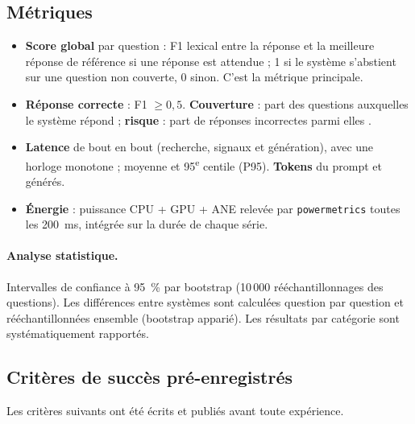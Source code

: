 \documentclass[11pt,a4paper]{article}
\begin{document}
\subsection{Métriques}

\begin{itemize}
\item \textbf{Score global} par question : F1 lexical entre la réponse et la meilleure réponse de
référence si une réponse est attendue ; 1 si le système s'abstient sur une question non couverte, 0
sinon. C'est la métrique principale.
\item \textbf{Réponse correcte} : F1 $\ge 0{,}5$. \textbf{Couverture} : part des questions auxquelles le
système répond ; \textbf{risque} : part de réponses incorrectes parmi elles \citep{kamath2020selective}.
\item \textbf{Latence} de bout en bout (recherche, signaux et génération), avec une horloge monotone ;
moyenne et 95\textsuperscript{e} centile (P95). \textbf{Tokens} du prompt et générés.
\item \textbf{Énergie} : puissance CPU + GPU + ANE relevée par \texttt{powermetrics} toutes les 200~ms,
intégrée sur la durée de chaque série.
\end{itemize}

\paragraph{Analyse statistique.} Intervalles de confiance à 95~\% par bootstrap (10\,000
rééchantillonnages des questions). Les différences entre systèmes sont calculées question par question
et rééchantillonnées ensemble (bootstrap apparié). Les résultats par catégorie sont systématiquement
rapportés.

\subsection{Critères de succès pré-enregistrés}

Les critères suivants ont été écrits et publiés avant toute expérience.

\begin{center}
\end{center}
\end{document}
